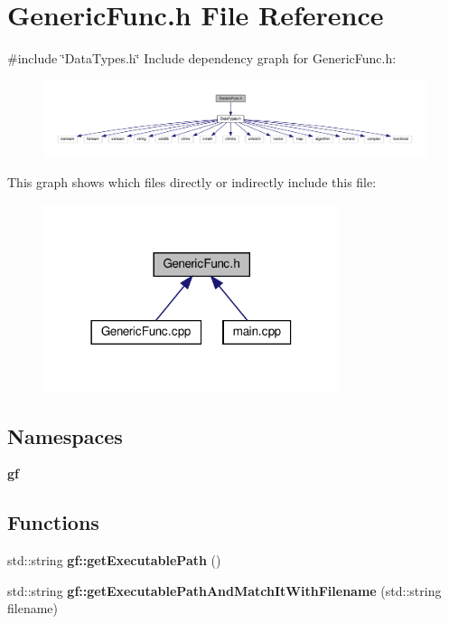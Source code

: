 \section{Generic\+Func.\+h File Reference}
\label{_generic_func_8h}
{\ttfamily \#include \char`\"{}Data\+Types.\+h\char`\"{}}\newline
Include dependency graph for Generic\+Func.\+h\+:
\nopagebreak
\begin{figure}[H]
\begin{center}
\leavevmode
\includegraphics[width=350pt]{_generic_func_8h__incl}
\end{center}
\end{figure}
This graph shows which files directly or indirectly include this file\+:
\nopagebreak
\begin{figure}[H]
\begin{center}
\leavevmode
\includegraphics[width=246pt]{_generic_func_8h__dep__incl}
\end{center}
\end{figure}
\subsection*{Namespaces}
\begin{DoxyCompactItemize}
\item 
 \textbf{ gf}
\end{DoxyCompactItemize}
\subsection*{Functions}
\begin{DoxyCompactItemize}
\item 
std\+::string \textbf{ gf\+::get\+Executable\+Path} ()
\item 
std\+::string \textbf{ gf\+::get\+Executable\+Path\+And\+Match\+It\+With\+Filename} (std\+::string filename)
\end{DoxyCompactItemize}
